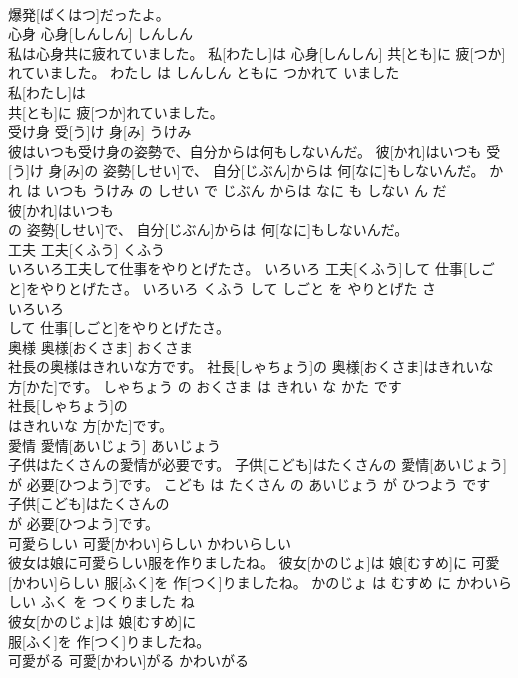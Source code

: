 \documentclass[8pt]{extreport}
\begin{document}
\begin{CJK}{UTF8}{min}
\\	爆発[ばくはつ]だったよ。			
\\	心身	心身[しんしん]	しんしん	
\\	私は心身共に疲れていました。	私[わたし]は 心身[しんしん] 共[とも]に 疲[つか]れていました。	わたし は しんしん ともに つかれて いました	
\\	私[わたし]は
\\	共[とも]に 疲[つか]れていました。			
\\	受け身	受[う]け 身[み]	うけみ	
\\	彼はいつも受け身の姿勢で、自分からは何もしないんだ。	彼[かれ]はいつも 受[う]け 身[み]の 姿勢[しせい]で、 自分[じぶん]からは 何[なに]もしないんだ。	かれ は いつも うけみ の しせい で じぶん からは なに も しない ん だ	
\\	彼[かれ]はいつも
\\	の 姿勢[しせい]で、 自分[じぶん]からは 何[なに]もしないんだ。			
\\	工夫	工夫[くふう]	くふう	
\\	いろいろ工夫して仕事をやりとげたさ。	いろいろ 工夫[くふう]して 仕事[しごと]をやりとげたさ。	いろいろ くふう して しごと を やりとげた さ	
\\	いろいろ
\\	して 仕事[しごと]をやりとげたさ。			
\\	奥様	奥様[おくさま]	おくさま	
\\	社長の奥様はきれいな方です。	社長[しゃちょう]の 奥様[おくさま]はきれいな 方[かた]です。	しゃちょう の おくさま は きれい な かた です	
\\	社長[しゃちょう]の
\\	はきれいな 方[かた]です。			
\\	愛情	愛情[あいじょう]	あいじょう	
\\	子供はたくさんの愛情が必要です。	子供[こども]はたくさんの 愛情[あいじょう]が 必要[ひつよう]です。	こども は たくさん の あいじょう が ひつよう です	
\\	子供[こども]はたくさんの
\\	が 必要[ひつよう]です。			
\\	可愛らしい	可愛[かわい]らしい	かわいらしい	
\\	彼女は娘に可愛らしい服を作りましたね。	彼女[かのじょ]は 娘[むすめ]に 可愛[かわい]らしい 服[ふく]を 作[つく]りましたね。	かのじょ は むすめ に かわいらしい ふく を つくりました ね	
\\	彼女[かのじょ]は 娘[むすめ]に
\\	服[ふく]を 作[つく]りましたね。			
\\	可愛がる	可愛[かわい]がる	かわいがる	

\end{CJK}
\end{document}

